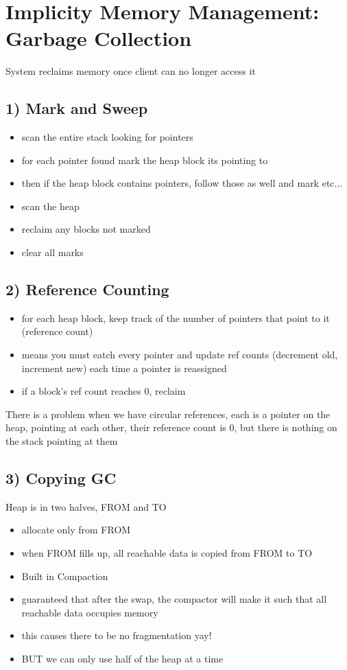 \documentclass[12pt]{article}
\begin{document}
	\section*{Implicity Memory Management: Garbage Collection}
	System reclaims memory once client can no longer access it\\
	\subsection*{1) Mark and Sweep}
	\begin{itemize}
		\item scan the entire stack looking for pointers
		\item for each pointer found mark the heap block its pointing to
		\item then if the heap block contains pointers, follow those as well and mark etc...
	\end{itemize}
	\begin{itemize}
		\item scan the heap
		\item reclaim any blocks not marked
		\item clear all marks
	\end{itemize}
	
	\subsection*{2) Reference Counting}
	\begin{itemize}
		\item for each heap block, keep track of the number of pointers that point to it (reference count)
		\item means you must eatch every pointer and update ref counts (decrement old, increment new) each time a pointer is reassigned
		\item if a block's ref count reaches 0, reclaim
	\end{itemize}
	There is a problem when we have circular references, each is a pointer on the heap, pointing at each other, their reference count is 0, but there is nothing on the stack pointing at them\\
	
	\subsection*{3) Copying GC}
	Heap is in two halves, FROM and TO\\
	\begin{itemize}
		\item allocate only from FROM
		\item when FROM fills up, all reachable data is copied from FROM to TO
		\item Built in Compaction
		\item guaranteed that after the swap, the compactor will make it such that all reachable data occupies memory
		\item this causes there to be no fragmentation yay!
		\item BUT we can only use half of the heap at a time
	\end{itemize}
	
\end{document}
